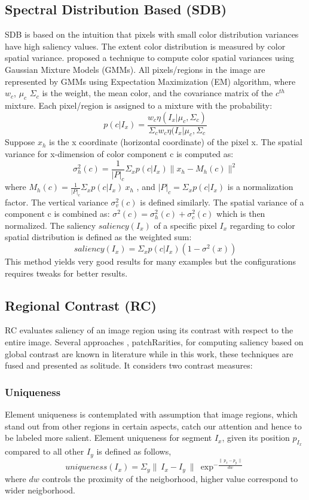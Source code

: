 \subsection{Spectral Distribution Based (SDB)} 
SDB is based on the intuition that pixels with small color distribution variances have high saliency values. The extent color distribution is measured by color spatial variance. \cite{spectralSal} proposed a technique to compute color spatial variances using Gaussian Mixture Models (GMMs). All pixels/regions in the image are represented by GMMs using Expectation Maximization (EM) algorithm, where $w_{c}$, $\mu_{c}$ $\Sigma_{c}$ is the weight, the mean color, and the covariance matrix of the $c^{th}$ mixture. Each pixel/region is assigned to a mixture with the probability:
$$p(c | I_{x}) = \frac{w_{c}\eta(I_{x}| \mu_{c},\Sigma_{c})}{\Sigma_{c}w_{c}\eta(I_{x}| \mu_{c},\Sigma_{c}} $$
Suppose $x_{h}$ is the x coordinate (horizontal coordinate) of the pixel x. The spatial variance for x-dimension of color component c is computed as:
$$\sigma_{h}^{2}(c) = \frac{1}{|P|_{c}}\Sigma_{x}	p(c | I_{x}) \parallel x_{h} -M_{h}(c) \parallel^{2}$$
where $M_{h}(c) = \frac{1}{|P|_{c}}\Sigma_{x}p(c|I_{x})~x_h$ , and $|P|_{c} = \Sigma_{x}p(c | I_{x})$ is a normalization factor. The vertical variance $\sigma_{v}^{2}(c)$ is defined similarly. The spatial variance of a component c is combined as: $\sigma^{2}(c) = \sigma_{h}^{2}(c) + \sigma_{c}^{2}(c)$ which is then normalized.
The saliency $saliency(I_{x})$ of a specific pixel $I_{x}$ regarding to color spatial
distribution is defined as the weighted sum:
$$saliency(I_{x}) = \Sigma_{x}p(c | I_{x})(1-\sigma^{2}(x))$$
This method yields very good results for many examples but the configurations requires tweaks for better results.

\subsection{Regional Contrast (RC)}
RC evaluates saliency of an image region using its contrast with respect to the entire image. Several approaches  \citep{globContrast}, {patchRarities}, \citep{salFilters} for computing saliency based on global contrast are known in literature while in this work, these techniques are fused and presented as solitude.
It considers two contrast measures:
\subsubsection{Uniqueness}
Element uniqueness is contemplated with  assumption that image regions, which stand out from other regions in certain aspects, catch our attention and hence to be labeled more salient. Element uniqueness for segment $I_{x}$, given its position $p_{I_{x}}$ compared to all other $I_{y}$ is defined as follows,
$$uniqueness(I_{x}) = \Sigma_{y} \parallel~I_{x} -I_{y}~\parallel~\exp^{-\frac{\parallel~p_{x} - p_{y}~\parallel}{dw}}$$
where $dw$ controls the proximity of the neigborhood, higher value correspond to wider neigborhood.
